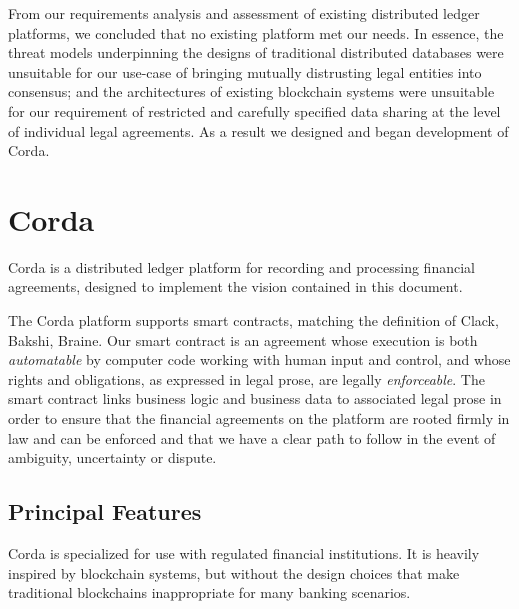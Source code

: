 \documentclass{article}
\begin{document}
From our requirements analysis and assessment of existing distributed ledger platforms, we concluded that no existing platform met our needs.  In essence, the threat models underpinning the designs of traditional distributed databases were unsuitable for our use-case of bringing mutually distrusting legal entities into consensus; and the architectures of existing blockchain systems were unsuitable for our requirement of restricted and carefully specified data sharing at the level of individual legal agreements.  As a result we designed and began development of Corda.

\section{Corda}
Corda is a distributed ledger platform for recording and processing financial agreements, designed to implement the vision contained in this document.  

The Corda platform supports smart contracts, matching the definition of Clack, Bakshi, Braine.\cite{SCT}  Our smart contract is an agreement whose execution is both \textit{automatable} by computer code working with human input and control, and whose rights and obligations, as expressed in legal prose, are legally \textit{enforceable}.  The smart contract links business logic and business data to associated legal prose in order to ensure that the financial agreements on the platform are rooted firmly in law and can be enforced and that we have a clear path to follow in the event of ambiguity, uncertainty or dispute.

\subsection{Principal Features}
Corda is specialized for use with regulated financial institutions. It is heavily inspired by blockchain systems, but without the design choices that make traditional blockchains inappropriate for many banking scenarios. 
\end{document}

